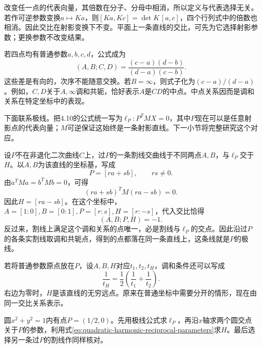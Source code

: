 改变任一点的代表向量，其倍数在分子、分母中相消，所以定义与代表选择无关。若作可逆参数变换\(a\mapsto Ka\)，则\([Ka,Kc]=\det K\,[a,c]\)，四个行列式中的倍数也相消。因此交比在射影变换下不变。平面上一条直线的交比，可先为它选择射影参数；更换参数不改变结果。

若四点均有普通参数\(a,b,c,d\)，公式成为
\begin{equation}\label{eq:quadratic-affine-cross-ratio}
 (A,B;C,D)=\frac{(c-a)(d-b)}{(d-a)(c-b)}.
\end{equation}
这些差是有向的，次序不能随意交换。若\(B=\infty\)，则式子化为\((c-a)/(d-a)\)。例如，\(C,D\)关于\(A,\infty\)调和共轭，恰好表示\(A\)是\(CD\)的中点。中点关系因而是调和关系在特定坐标中的表现。

下面联系极线。把4.10的公式统一写为\(\ell_P:P^TMX=0\)，其中\(P\)现在可以是任意射影点的代表向量；\(M\)可逆保证这始终是一条射影直线。下一小节将完整研究这个对应。

设\(P\)不在非退化二次曲线\(C\)上，过\(P\)的一条割线交曲线于不同两点\(A,B\)，与\(\ell_P\)交于\(H\)。以\(A,B\)为该直线的坐标基，写成
\begin{equation*}
 P=[ra+sb],\qquad r s\ne0.
\end{equation*}
由\(a^TMa=b^TMb=0\)，可得
\begin{equation*}
 (ra+sb)^TM(ra-sb)=0.
\end{equation*}
因此\(H=[ra-sb]\)。在这个坐标中，\(A=[1:0],B=[0:1],P=[r:s],H=[r:-s]\)，代入交比恰得
\begin{equation}\label{eq:quadratic-harmonic-polar}
 (A,B;P,H)=-1.
\end{equation}
反过来，割线上满足这个调和关系的点唯一，必是割线与\(\ell_P\)的交点。因此沿过\(P\)的各条实割线取调和共轭点，得到的点都落在同一条直线上，这条线就是\(P\)的极线。

若将普通参数原点放在\(P\)，设\(A,B,H\)对应\(t_1,t_2,t_H\)，调和条件还可以写成
\begin{equation}\label{eq:quadratic-harmonic-reciprocal-parameters}
 \frac1{t_H}=\frac12\left(\frac1{t_1}+\frac1{t_2}\right).
\end{equation}
右边为零时，\(H\)是该直线的无穷远点。原来在普通坐标中需要分开的情形，现在由同一交比关系表示。

\par\addvspace{6pt}
\noindent\begin{minipage}{\linewidth}
\begin{example}
圆\(x^2+y^2=1\)内有点\(P=(1/2,0)\)。先用极线公式求\(\ell_P\)，再沿\(x\)轴求两个圆交点关于\(P\)的参数，利用式\eqref{eq:quadratic-harmonic-reciprocal-parameters}求\(H\)。最后选择另一条过\(P\)的割线作同样核对。
\end{example}
\end{minipage}\par\addvspace{6pt}


